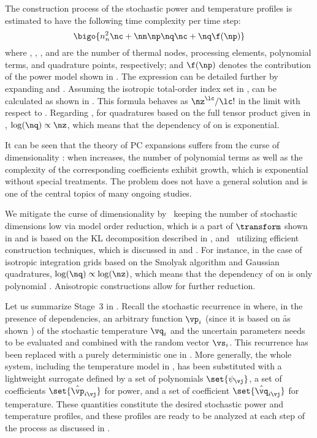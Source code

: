 The construction process of the stochastic power and temperature profiles is
estimated to have the following time complexity per time step:
\[
  \bigo{n_n^2 \nc + \nn \np \nq \nc + \nq \f(\np)}
\]
where \nn, \np, \nc, and \nq are the number of thermal nodes, processing
elements, polynomial terms, and quadrature points, respectively; and $\f(\np)$
denotes the contribution of the power model shown in .
The expression can be detailed further by expanding \nc and \nq. Assuming the
isotropic total-order index set in , \nc can
be calculated as shown in . This
formula behaves as $\nz^\lc / \lc!$ in the limit with respect to \nz. Regarding
\nq, for quadratures based on the full tensor product given in
, $\log(\nq) \propto \nz$, which means that the
dependency of \nq on \nz is exponential.

It can be seen that the theory of \ac{PC} expansions suffers from the curse of
dimensionality \cite{eldred2008, xiu2010}: when \nz increases, the number of
polynomial terms as well as the complexity of the corresponding coefficients
exhibit growth, which is exponential without special treatments. The problem
does not have a general solution and is one of the central topics of many
ongoing studies.

We mitigate the curse of dimensionality by \one~keeping the number of stochastic
dimensions low via model order reduction, which is a part of $\transform$ shown
in  and is based on the \ac{KL} decomposition
described in , and \two~utilizing efficient
construction techniques, which is discussed in  and
. For instance, in the case of isotropic integration
grids based on the Smolyak algorithm and Gaussian quadratures, $\log(\nq)
\propto \log(\nz)$, which means that the dependency of \nq on \nz is only
polynomial \cite{heiss2008}. Anisotropic constructions allow for further
reduction.

Let us summarize Stage~3 in . Recall the stochastic
recurrence in  where, in the presence of
dependencies, an arbitrary function $\vp_i$ (since it is based on \f as shown
) of the stochastic temperature $\vq_i$ and the
uncertain parameters \vu needs to be evaluated and combined with the random
vector $\vs_i$. This recurrence has been replaced with a purely deterministic
one in . More generally, the whole system, including the
temperature model in , has been substituted
with a lightweight surrogate defined by a set of polynomials $\set{\psi_{\vj}}$,
a set of coefficients $\set{\hat{\vp}_{i \vj}}$ for power, and a set of
coefficient $\set{\hat{\vq}_{i \vj}}$ for temperature. These quantities
constitute the desired stochastic power and temperature profiles, and these
profiles are ready to be analyzed at each step of the process as discussed in
.


